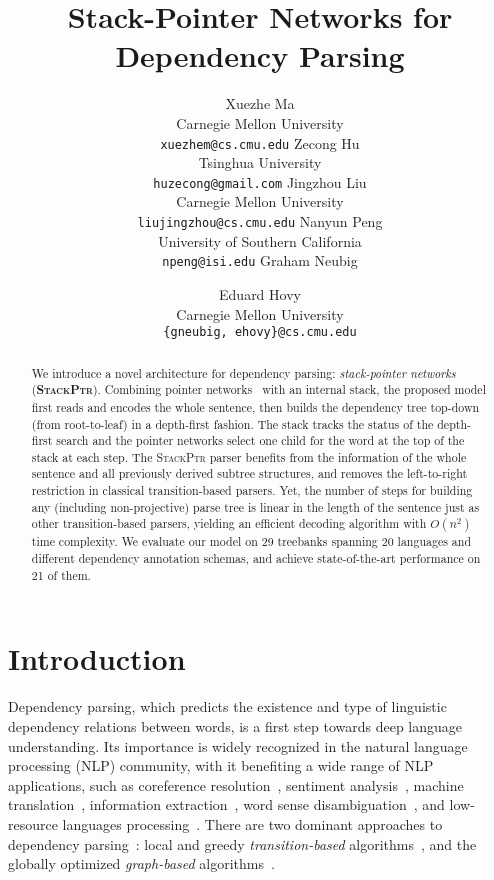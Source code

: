 \documentclass[11pt,a4paper]{article}
\title{Stack-Pointer Networks for Dependency Parsing}
\author{
Xuezhe Ma \\ Carnegie Mellon University \\ {\tt xuezhem@cs.cmu.edu}
\And Zecong Hu\Thanks{Work done while at Carnegie Mellon University.} \\ Tsinghua University \\ {\tt huzecong@gmail.com}
\And Jingzhou Liu \\ Carnegie Mellon University \\ {\tt liujingzhou@cs.cmu.edu}
\AND 
Nanyun Peng \\ University of Southern California \\ {\tt npeng@isi.edu} 
\And Graham Neubig \and Eduard Hovy \\ Carnegie Mellon University \\ {\tt \{gneubig, ehovy\}@cs.cmu.edu}
}
\date{}
\begin{document}
\maketitle

\begin{abstract}
We introduce a novel architecture for dependency parsing: \emph{stack-pointer networks} (\textbf{\textsc{StackPtr}}). 
Combining pointer networks~\citep{vinyals2015pointer} with an internal stack, the proposed model first reads and encodes the whole sentence, then builds the dependency tree top-down (from root-to-leaf) in a depth-first fashion. 
The stack tracks the status of the depth-first search and the pointer networks select one child for the word at the top of the stack at each step. 
The \textsc{StackPtr} parser benefits from the information of the whole sentence and all previously derived subtree structures, and removes the left-to-right restriction in classical transition-based parsers.
Yet, the number of steps for building any (including non-projective) parse tree is linear in the length of the sentence just as other transition-based parsers, yielding an efficient decoding algorithm with $O(n^2)$ time complexity. 
We evaluate our model on 29 treebanks spanning 20 languages and different dependency annotation schemas, and achieve state-of-the-art performance on 21 of them.
\end{abstract}

\section{Introduction}
\label{sec:intro}
Dependency parsing, which predicts the existence and type of linguistic dependency relations between words, is a first step towards deep language understanding. Its importance is widely recognized in the natural language processing (NLP) community, with it benefiting a wide range of NLP applications, such as coreference resolution~\citep{ng:2010:ACL,durrett-klein:2013:EMNLP,ma-hovy:2016:NAACL}, sentiment analysis~\citep{tai-socher-manning:2015:ACL-IJCNLP}, machine translation~\citep{bastings-EtAl:2017:EMNLP2017}, information extraction~\citep{nguyen:2009:EMNLP,angeli:2015:ACL,peng2017cross}, 
word sense disambiguation~\citep{fauceglia-EtAl:2015:EVENTS}, and low-resource languages processing~\citep{mcdonald-EtAl:2013:Short,ma-xia:2014:P14-1}.
There are two dominant approaches to dependency parsing~\citep{Buchholz:2006,nivre:CoNLL2007}: local and greedy \emph{transition-based} algorithms~\citep{yamada2003statistical,Nivre:2004,zhang-nivre:2011,chen-manning:EMNLP2014},  and the globally optimized \emph{graph-based} algorithms~\citep{eisner1996three,McDonald:2005,McDonald:2005b,Koo:2010}.
\end{document}
